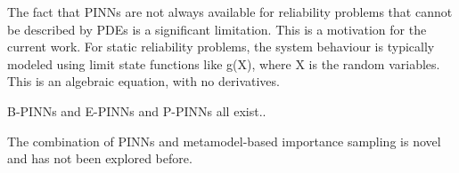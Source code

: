 The fact that PINNs are not always available for reliability problems that cannot be described by PDEs is a significant limitation. This is a motivation for the current work. For static reliability problems, the system behaviour is typically modeled using limit state functions like g(X), where X is the random variables. This is an algebraic equation, with no derivatives. 



B-PINNs and E-PINNs and P-PINNs all exist..

The combination of PINNs and metamodel-based importance sampling is novel and has not been explored before. 

